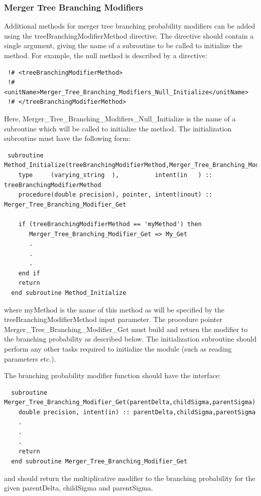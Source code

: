 \subsubsection{Merger Tree Branching Modifiers}\label{sec:treeBranchingModifierMethod}

Additional methods for merger tree branching probability modifiers can be added using the {\normalfont \ttfamily treeBranchingModifierMethod} directive. The directive should contain a single argument, giving the name of a subroutine to be called to initialize the method. For example, the {\normalfont \ttfamily null} method is described by a directive:
\begin{verbatim}
 !# <treeBranchingModifierMethod>
 !#  <unitName>Merger_Tree_Branching_Modifiers_Null_Initialize</unitName>
 !# </treeBranchingModifierMethod>
\end{verbatim}
Here, {\normalfont \ttfamily Merger\_Tree\_Branching\_Modifiers\_Null\_Initialize} is the name of a subroutine which will be called to initialize the method. The initialization subroutine must have the following form:
\begin{verbatim}
 subroutine Method_Initialize(treeBranchingModifierMethod,Merger_Tree_Branching_Modifier_Get)
    type     (varying_string  ),          intent(in   ) :: treeBranchingModifierMethod
    procedure(double precision), pointer, intent(inout) :: Merger_Tree_Branching_Modifier_Get
    
    if (treeBranchingModifierMethod == 'myMethod') then
       Merger_Tree_Branching_Modifier_Get => My_Get
       .
       .
       .
    end if
    return
  end subroutine Method_Initialize
\end{verbatim}
where {\normalfont \ttfamily myMethod} is the name of this method as will be specified by the {\normalfont \ttfamily treeBranchingModifierMethod} input parameter. The procedure pointer {\normalfont \ttfamily Merger\_Tree\_Branching\_Modifier\_Get} must build and return the modifier to the branching probability as described below. The initialization subroutine should perform any other tasks required to initialize the module (such as reading parameters etc.).

The branching probability modifier function should have the interface:
\begin{verbatim}
  subroutine Merger_Tree_Branching_Modifier_Get(parentDelta,childSigma,parentSigma)
    double precision, intent(in) :: parentDelta,childSigma,parentSigma
    .
    .
    .
    return
  end subroutine Merger_Tree_Branching_Modifier_Get
\end{verbatim}
and should return the multiplicative modifier to the branching probability for the given {\normalfont \ttfamily parentDelta}, {\normalfont \ttfamily childSigma} and {\normalfont \ttfamily parentSigma}.

